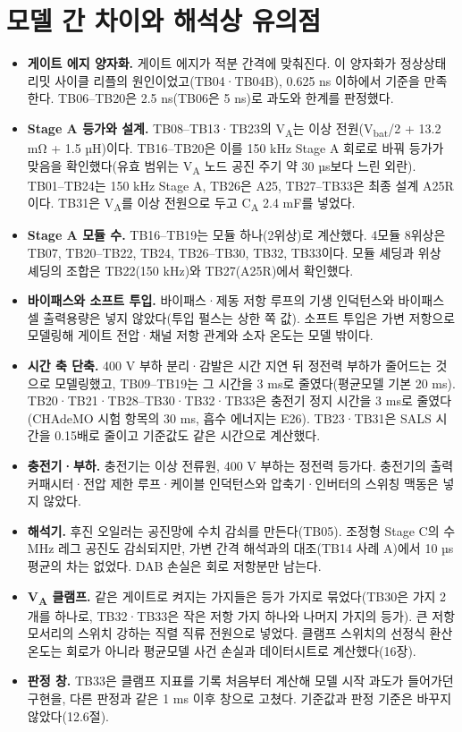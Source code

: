 \section{모델 간 차이와 해석상 유의점}

\begin{itemize}
\item \textbf{게이트 에지 양자화.} 게이트 에지가 적분 간격에 맞춰진다. 이 양자화가 정상상태 리밋 사이클 리플의 원인이었고(TB04·TB04B), 0.625 ns 이하에서 기준을 만족한다. TB06–TB20은 2.5 ns(TB06은 5 ns)로 과도와 한계를 판정했다.
\item \textbf{Stage A 등가와 설계.} TB08–TB13·TB23의 V\textsubscript{A}는 이상 전원(V\textsubscript{bat}/2 + 13.2 mΩ + 1.5 µH)이다. TB16–TB20은 이를 150 kHz Stage A 회로로 바꿔 등가가 맞음을 확인했다(유효 범위는 V\textsubscript{A} 노드 공진 주기 약 30 µs보다 느린 외란). TB01–TB24는 150 kHz Stage A, TB26은 A25, TB27–TB33은 최종 설계 A25R이다. TB31은 V\textsubscript{A}를 이상 전원으로 두고 C\textsubscript{A} 2.4 mF를 넣었다.
\item \textbf{Stage A 모듈 수.} TB16–TB19는 모듈 하나(2위상)로 계산했다. 4모듈 8위상은 TB07, TB20–TB22, TB24, TB26–TB30, TB32, TB33이다. 모듈 셰딩과 위상 셰딩의 조합은 TB22(150 kHz)와 TB27(A25R)에서 확인했다.
\item \textbf{바이패스와 소프트 투입.} 바이패스·제동 저항 루프의 기생 인덕턴스와 바이패스 셀 출력용량은 넣지 않았다(투입 펄스는 상한 쪽 값). 소프트 투입은 가변 저항으로 모델링해 게이트 전압·채널 저항 관계와 소자 온도는 모델 밖이다.
\item \textbf{시간 축 단축.} 400 V 부하 분리·감발은 시간 지연 뒤 정전력 부하가 줄어드는 것으로 모델링했고, TB09–TB19는 그 시간을 3 ms로 줄였다(평균모델 기본 20 ms). TB20·TB21·TB28–TB30·TB32·TB33은 충전기 정지 시간을 3 ms로 줄였다(CHAdeMO 시험 항목의 30 ms\cite{b16}, 흡수 에너지는 E26). TB23·TB31은 SALS 시간을 0.15배로 줄이고 기준값도 같은 시간으로 계산했다.
\item \textbf{충전기·부하.} 충전기는 이상 전류원, 400 V 부하는 정전력 등가다. 충전기의 출력 커패시터·전압 제한 루프·케이블 인덕턴스와 압축기·인버터의 스위칭 맥동은 넣지 않았다.
\item \textbf{해석기.} 후진 오일러는 공진망에 수치 감쇠를 만든다(TB05). 조정형 Stage C의 수 MHz 레그 공진도 감쇠되지만, 가변 간격 해석과의 대조(TB14 사례 A)에서 10 µs 평균의 차는 없었다. DAB 손실은 회로 저항분만 남는다.
\item \textbf{V\textsubscript{A} 클램프.} 같은 게이트로 켜지는 가지들은 등가 가지로 묶었다(TB30은 가지 2개를 하나로, TB32·TB33은 작은 저항 가지 하나와 나머지 가지의 등가). 큰 저항 모서리의 스위치 강하는 직렬 직류 전원으로 넣었다. 클램프 스위치의 선정식 환산온도는 회로가 아니라 평균모델 사건 손실과 데이터시트로 계산했다(16장).
\item \textbf{판정 창.} TB33은 클램프 지표를 기록 처음부터 계산해 모델 시작 과도가 들어가던 구현을, 다른 판정과 같은 1 ms 이후 창으로 고쳤다. 기준값과 판정 기준은 바꾸지 않았다(12.6절).
\end{itemize}
